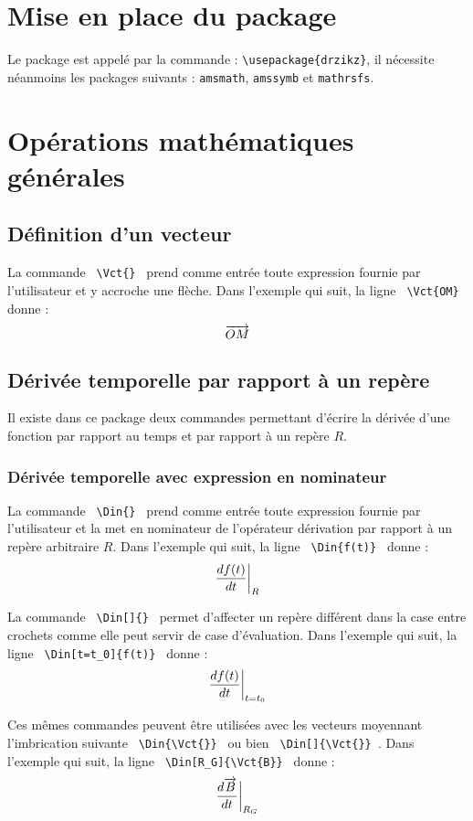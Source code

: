 \documentclass[12pt]{article}
\begin{document}
\section{Mise en place du package}

Le package est appelé par la commande : \verb|\usepackage{drzikz}|, il nécessite néanmoins les packages suivants : \verb|amsmath|, \verb|amssymb| et \verb|mathrsfs|.

\newpage

\section{Opérations mathématiques générales}

\subsection{Définition d'un vecteur}
La commande \verb| \Vct{} | prend comme entrée toute expression fournie par l'utilisateur et y accroche une flèche. Dans l'exemple qui suit, la ligne  \verb| \Vct{OM} | donne : $$ \Vct{OM} $$

\subsection{Dérivée temporelle par rapport à un repère}
Il existe dans ce package deux commandes permettant d'écrire la dérivée d'une fonction par rapport au temps et par rapport à un repère $R$.

\subsubsection{Dérivée temporelle avec expression en nominateur}
La commande \verb| \Din{} | prend comme entrée toute expression fournie par l'utilisateur et la met en nominateur de l'opérateur dérivation par rapport à un repère arbitraire $R$. Dans l'exemple qui suit, la ligne  \verb| \Din{f(t)} | donne : $$ \Din{f(t)} $$

La commande \verb| \Din[]{} | permet d'affecter un repère différent dans la case entre crochets comme elle peut servir de case d'évaluation. Dans l'exemple qui suit, la ligne  \verb| \Din[t=t_0]{f(t)} | donne : $$ \Din[t=t_0]{f(t)} $$

Ces mêmes commandes peuvent être utilisées avec les vecteurs moyennant l'imbrication suivante \verb| \Din{\Vct{}} | ou bien \verb| \Din[]{\Vct{}} |. Dans l'exemple qui suit, la ligne  \verb| \Din[R_G]{\Vct{B}} | donne : $$ \Din[R_G]{\Vct{B}} $$
\end{document}
